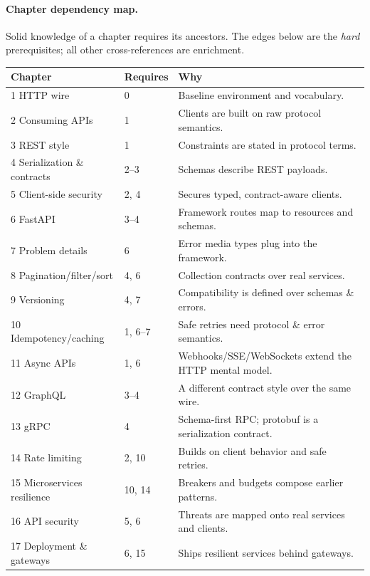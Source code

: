 \paragraph{Chapter dependency map.}
Solid knowledge of a chapter requires its ancestors. The edges below are the
\emph{hard} prerequisites; all other cross-references are enrichment.

\begin{table}[h]
  \centering
  \small
  \begin{tabularx}{\textwidth}{l l X}
    \toprule
    \textbf{Chapter} & \textbf{Requires} & \textbf{Why} \\
    \midrule
    1 HTTP wire & 0 & Baseline environment and vocabulary. \\
    2 Consuming APIs & 1 & Clients are built on raw protocol semantics. \\
    3 REST style & 1 & Constraints are stated in protocol terms. \\
    4 Serialization \& contracts & 2--3 & Schemas describe REST payloads. \\
    5 Client-side security & 2, 4 & Secures typed, contract-aware clients. \\
    6 FastAPI & 3--4 & Framework routes map to resources and schemas. \\
    7 Problem details & 6 & Error media types plug into the framework. \\
    8 Pagination/filter/sort & 4, 6 & Collection contracts over real services. \\
    9 Versioning & 4, 7 & Compatibility is defined over schemas \& errors. \\
    10 Idempotency/caching & 1, 6--7 & Safe retries need protocol \& error semantics. \\
    11 Async APIs & 1, 6 & Webhooks/SSE/WebSockets extend the HTTP mental model. \\
    12 GraphQL & 3--4 & A different contract style over the same wire. \\
    13 gRPC & 4 & Schema-first RPC; protobuf is a serialization contract. \\
    14 Rate limiting & 2, 10 & Builds on client behavior and safe retries. \\
    15 Microservices resilience & 10, 14 & Breakers and budgets compose earlier patterns. \\
    16 API security & 5, 6 & Threats are mapped onto real services and clients. \\
    17 Deployment \& gateways & 6, 15 & Ships resilient services behind gateways. \\

\end{tabularx}
\end{table}
